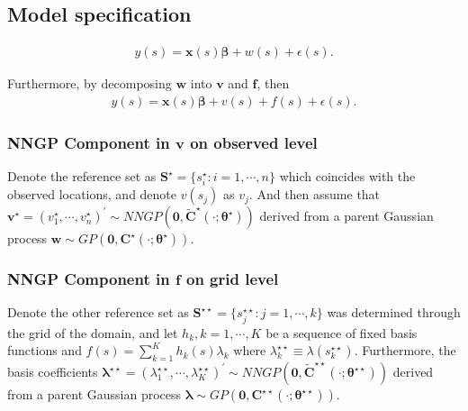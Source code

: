 \documentclass[
12pt, %
a4paper, %
oneside, %
headinclude,footinclude, %
BCOR5mm, %
]{scrartcl}
\begin{document}
\subsection{\textcolor[rgb]{1.00,0.00,0.50}{Model specification}}
\begin{equation}
\begin{aligned}
  y(s) = \boldsymbol{x}(s)\boldsymbol{\beta} + w(s) + \epsilon(s).
\end{aligned} \label{model1}
\end{equation}

Furthermore, by decomposing $\boldsymbol{w}$ into $\boldsymbol{v}$ and $\boldsymbol{f}$, then 
\begin{equation}
\begin{aligned}
  y(s) = \boldsymbol{x}(s)\boldsymbol{\beta} + v(s) + f(s) + \epsilon(s).
\end{aligned} \label{DP1}
\end{equation}
\subsubsection{NNGP Component in $\boldsymbol{v}$ on observed level}
Denote the reference set as $\boldsymbol{S}^{\star} = \{s_i^{\star}: i = 1, \cdots, n\}$ which coincides with the observed locations, and denote $v(s_j)$ as $v_j$. 
And then assume that $\boldsymbol{v}^{\star} = \left(v_1^{\star}, \cdots, v_n^{\star}\right)^\prime \sim NNGP\left(\boldsymbol{0}, \boldsymbol{\tilde{C}^{\star}}(\cdot; \boldsymbol{\theta}^{\star})\right)$ derived from a parent Gaussian process $\boldsymbol{w} \sim GP\left(\boldsymbol{0}, \boldsymbol{{C}^{\star}}(\cdot; \boldsymbol{\theta}^{\star})\right)$.

\subsubsection{NNGP Component in $\boldsymbol{f}$ on grid level}
Denote the other reference set as $\boldsymbol{S}^{\star\star} = \{s_j^{\star\star}: j = 1, \cdots, k\}$ was determined through the grid of the domain, and 
let $h_{k}, k = 1, \cdots, K$ be a sequence of fixed basis functions and $f(s) = \sum_{k = 1}^{K}h_{k}(s)\lambda_{k}$ where $\lambda_{k}^{\star\star} \equiv \lambda(s_k^{\star\star})$. Furthermore, the basis coefficients $\boldsymbol{\lambda}^{\star\star} = \left(\lambda_1^{\star\star}, \cdots, \lambda_K^{\star\star}\right)^\prime \sim NNGP\left(\boldsymbol{0}, \boldsymbol{\tilde{C}}^{\star\star}(\cdot; \boldsymbol{\theta}^{\star\star})\right)$ derived from a parent Gaussian process $\boldsymbol{\lambda} \sim GP\left(\boldsymbol{0}, \boldsymbol{{C}^{\star\star}}(\cdot; \boldsymbol{\theta}^{\star\star})\right)$.
\end{document}
